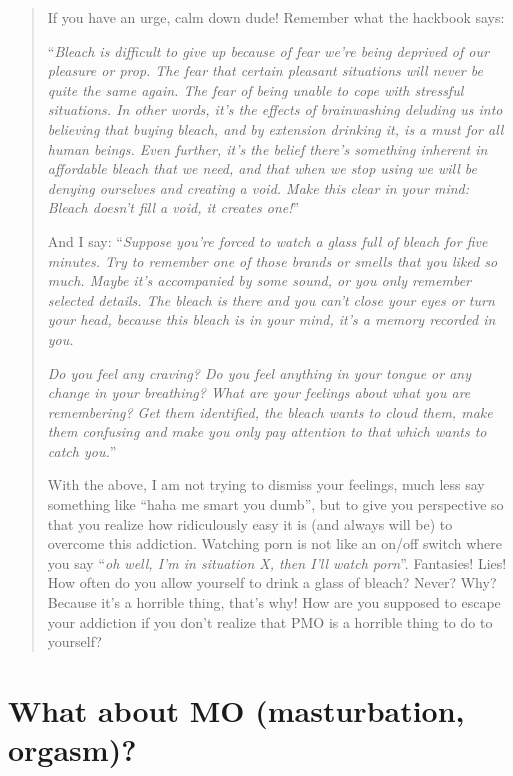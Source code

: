 \documentclass[
]{book}
\begin{document}
\begin{quote}
If you have an urge, calm down dude! Remember what the hackbook says:

``\emph{Bleach is difficult to give up because of fear we're being deprived of our pleasure or prop. The fear that certain pleasant situations will never be quite the same again. The fear of being unable to cope with stressful situations. In other words, it's the effects of brainwashing deluding us into believing that buying bleach, and by extension drinking it, is a must for all human beings. Even further, it's the belief there's something inherent in affordable bleach that we need, and that when we stop using we will be denying ourselves and creating a void. Make this clear in your mind: Bleach doesn't fill a void, it creates one!}''

And I say:
``\emph{Suppose you're forced to watch a glass full of bleach for five minutes. Try to remember one of those brands or smells that you liked so much. Maybe it's accompanied by some sound, or you only remember selected details. The bleach is there and you can't close your eyes or turn your head, because this bleach is in your mind, it's a memory recorded in you.}

\emph{Do you feel any craving? Do you feel anything in your tongue or any change in your breathing? What are your feelings about what you are remembering? Get them identified, the bleach wants to cloud them, make them confusing and make you only pay attention to that which wants to catch you.}''

With the above, I am not trying to dismiss your feelings, much less say something like ``haha me smart you dumb'', but to give you perspective so that you realize how ridiculously easy it is (and always will be) to overcome this addiction.
Watching porn is not like an on/off switch where you say ``\emph{oh well, I'm in situation X, then I'll watch porn}''. Fantasies! Lies! How often do you allow yourself to drink a glass of bleach? Never? Why? Because it's a horrible thing, that's why! How are you supposed to escape your addiction if you don't
realize that PMO is a horrible thing to do to yourself?
\end{quote}

\hypertarget{what-about-mo-masturbation-orgasm}{%
\section{What about MO (masturbation, orgasm)?}\label{what-about-mo-masturbation-orgasm}}
\end{document}
